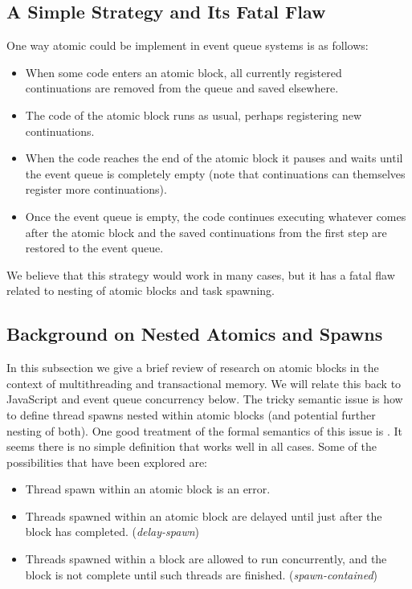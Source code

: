 \documentclass[sigplan,10pt,review,anonymous]{acmart}\settopmatter{printfolios=true,printccs=false,printacmref=false}
\begin{document}
\subsection{A Simple Strategy and Its Fatal Flaw}

One way atomic could be implement in event queue systems is as follows:

\begin{itemize}
\item When some code enters an atomic block, all currently registered continuations are removed from the queue and saved elsewhere.
\item The code of the atomic block runs as usual, perhaps registering new continuations.
\item When the code reaches the end of the atomic block it pauses and waits until the event queue is completely empty (note that continuations can themselves register more continuations).
\item Once the event queue is empty, the code continues executing whatever comes after the atomic block and the saved continuations from the first step are restored to the event queue.
\end{itemize}

We believe that this strategy would work in many cases, but it has a fatal flaw related to nesting of atomic blocks and task spawning.

\subsection{Background on Nested Atomics and Spawns}

In this subsection we give a brief review of research on atomic blocks in the context of multithreading and transactional memory.
We will relate this back to JavaScript and event queue concurrency below.
The tricky semantic issue is how to define thread spawns nested within atomic blocks (and potential further nesting of both).
One good treatment of the formal semantics of this issue is \cite{Moore2008}.
It seems there is no simple definition that works well in all cases.
Some of the possibilities that have been explored are:
\begin{itemize}
  \item Thread spawn within an atomic block is an error.
  \item Threads spawned within an atomic block are delayed until just after the block has completed. (\emph{delay-spawn})
  \item Threads spawned within a block are allowed to run concurrently, and the block is not complete until such threads are finished. (\emph{spawn-contained})
\end{itemize}
\end{document}
